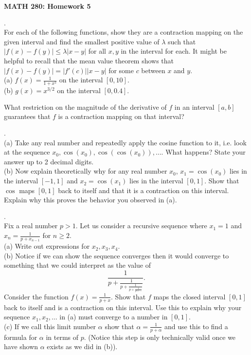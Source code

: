 \documentclass[12 pt]{article}
\begin{document}
\centerline{\bf MATH 280: Homework 5 }

\bigskip

. \\
For each of the following functions, show they are a contraction mapping on the given interval and find the smallest positive value of 
$\lambda$ such that $|f(x)-f(y)| \leq \lambda |x-y|$ for all $x,y$ in the interval for each. It might be helpful to recall that the mean value theorem 
shows that $|f(x)-f(y)|=|f'(c)||x-y|$ for some $c$ between $x$ and $y$. 
\\
(a) $f(x)=\frac{1}{1+x^2}$ on the interval $[0,10]$. 
\\
(b) $g(x)=x^{3/2}$ on the interval $[0,0.4]$. \\
\medskip

\noindent What restriction on the magnitude of the derivative of $f$
in an interval $[a,b]$ guarantees that $f$ is a contraction mapping on that
interval?

\medskip

. \\
(a) Take any real number and repeatedly apply the cosine function to it, i.e. look at the sequence $x_0, \cos(x_0), \cos(\cos(x_0)), \dots$. 
What happens? State your answer up to 2 decimal digits. \\
(b) Now explain theoretically why for any real number $x_0$, $x_1=\cos(x_0)$ lies in the interval $[-1,1]$ and $x_2=\cos(x_1)$ lies in the interval
$[0,1]$. Show that $\cos$ maps $[0,1]$ back to itself and that it is a contraction on this interval. Explain why this proves the behavior you observed 
in (a).

\medskip

. \\
Fix a real number $p > 1$. Let us consider a recursive sequence where $x_1=1$ and $x_n=\frac{1}{p+x_{n-1}}$ for $n \geq 2$. \\
(a) Write out expressions for $x_2, x_3, x_4$. \\
(b) Notice if we can show the sequence converges then it would converge to something that we could interpret as the value of 
$$
\frac{1}{p+\frac{1}{p+\frac{1}{p+\frac{1}{p+\dots}}}}.
$$
Consider the function $f(x)=\frac{1}{p+x}$. Show that $f$ maps the closed interval $[0,1]$ back to itself and is a contraction on this interval.
Use this to explain why your sequence $x_1,x_2,\dots$ in (a) must converge to a number in $[0,1]$. \\
(c) If we call this limit number $\alpha$ show that $\alpha = \frac{1}{p+\alpha}$ and use this to find a formula for $\alpha$ in terms of $p$. 
(Notice this step is only technically valid once we have shown $\alpha$ exists as we did in (b)).
\end{document}
